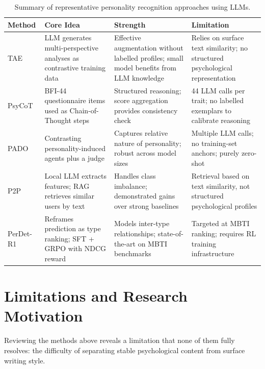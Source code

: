 \documentclass[../main.tex]{subfiles}
\begin{document}
\begin{table}[ht]
  \centering
  \caption{Summary of representative personality recognition approaches using LLMs.}
  \label{tab:related_summary}
  \begin{tabular}{p{2.4cm} p{3.0cm} p{3.5cm} p{4.2cm}}
    \toprule
    \textbf{Method} & \textbf{Core Idea} & \textbf{Strength} & \textbf{Limitation} \\
    \midrule
    TAE~\cite{hu2024llm}
      & LLM generates multi-perspective analyses as contrastive training data
      & Effective augmentation without labelled profiles; small model benefits from LLM knowledge
      & Relies on surface text similarity; no structured psychological representation \\[6pt]
    PsyCoT~\cite{yang2023psycot}
      & BFI-44 questionnaire items used as Chain-of-Thought steps
      & Structured reasoning; score aggregation provides consistency check
      & 44 LLM calls per trait; no labelled exemplars to calibrate reasoning \\[6pt]
    PADO~\cite{yeo2025pado}
      & Contrasting personality-induced agents plus a judge
      & Captures relative nature of personality; robust across model sizes
      & Multiple LLM calls; no training-set anchors; purely zero-shot \\[6pt]
    P2P~\cite{ma2025post}
      & Local LLM extracts features; RAG retrieves similar users by text
      & Handles class imbalance; demonstrated gains over strong baselines
      & Retrieval based on text similarity, not structured psychological profiles \\[6pt]
    PerDet-R1~\cite{cao2026classification}
      & Reframes prediction as type ranking; SFT + GRPO with NDCG reward
      & Models inter-type relationships; state-of-the-art on MBTI benchmarks
      & Targeted at MBTI ranking; requires RL training infrastructure \\
    \bottomrule
  \end{tabular}
\end{table}

\section{Limitations and Research Motivation}
\label{sec:motivation}

Reviewing the methods above reveals a limitation that none of them fully resolves: the difficulty of separating stable psychological content from surface writing style.
\end{document}
